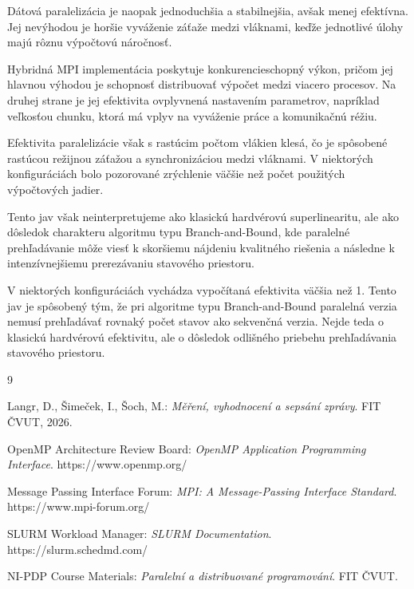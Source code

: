 \documentclass[a4paper]{article}
\begin{document}
Dátová paralelizácia je naopak jednoduchšia a stabilnejšia, avšak menej efektívna. Jej nevýhodou je horšie vyváženie záťaže medzi vláknami, keďže jednotlivé úlohy majú rôznu výpočtovú náročnosť.

Hybridná MPI implementácia poskytuje konkurencieschopný výkon, pričom jej hlavnou výhodou je schopnosť distribuovať výpočet medzi viacero procesov. 
Na druhej strane je jej efektivita ovplyvnená nastavením parametrov, napríklad veľkosťou chunku, ktorá má vplyv na vyváženie práce a komunikačnú réžiu.

Efektivita paralelizácie však s rastúcim počtom vlákien klesá, čo je spôsobené rastúcou režijnou záťažou a synchronizáciou medzi vláknami.
V niektorých konfiguráciách bolo pozorované zrýchlenie väčšie než počet použitých výpočtových jadier. 

Tento jav však neinterpretujeme ako klasickú hardvérovú superlinearitu, ale ako dôsledok charakteru algoritmu typu Branch-and-Bound, kde paralelné prehľadávanie môže viesť k skoršiemu nájdeniu kvalitného riešenia a následne k intenzívnejšiemu prerezávaniu stavového priestoru.

V niektorých konfiguráciách vychádza vypočítaná efektivita väčšia než 1. 
Tento jav je spôsobený tým, že pri algoritme typu Branch-and-Bound paralelná verzia nemusí prehľadávať rovnaký počet stavov ako sekvenčná verzia. 
Nejde teda o klasickú hardvérovú efektivitu, ale o dôsledok odlišného priebehu prehľadávania stavového priestoru.


\begin{thebibliography}{9}

Langr, D., Šimeček, I., Šoch, M.:
\textit{Měření, vyhodnocení a sepsání zprávy}.
FIT ČVUT, 2026.

OpenMP Architecture Review Board:
\textit{OpenMP Application Programming Interface}.
https://www.openmp.org/

Message Passing Interface Forum:
\textit{MPI: A Message-Passing Interface Standard}.
https://www.mpi-forum.org/

SLURM Workload Manager:
\textit{SLURM Documentation}.
https://slurm.schedmd.com/

NI-PDP Course Materials:
\textit{Paralelní a distribuované programování}.
FIT ČVUT.

\end{thebibliography}
\end{document}
